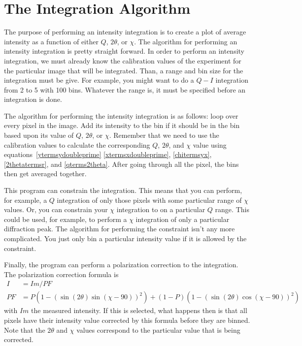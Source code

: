 \section{The Integration Algorithm}

The purpose of performing an intensity integration is 
to create a plot of average intensity as a function
of either $Q$, $2\theta$, or $\chi$. The algorithm
for performing an intensity integration is pretty
straight forward. In order to perform an intensity
integration, we must already know the calibration values
of the experiment for the particular image that will
be integrated. Than, a range and bin size for the
integration must be give. For example, you might
want to do a $Q-I$ integration from 2 to 5 with
100 bins. Whatever the range is, it 
must be specified before an integration is done.

The algorithm for performing the intensity integration
is as follows: loop over every pixel in the image. 
Add its intensity to the bin if it should be
in the bin based upon its value of $Q$, $2\theta$, or 
$\chi$. Remember that we need to use the calibration
values to calculate the corresponding $Q$, $2\theta$, and 
$\chi$ value using equations~\ref{ytermsydoubleprime}
\ref{xtermsxdoubleprime}, \ref{chitermsyx}, 
\ref{2thetatermsr}, and \ref{qterms2theta}.
After going through all the pixel, the bins then get averaged 
together. 

This program can constrain the integration. 
This means that you can perform, for example,
a $Q$ integration of only those pixels with some
particular range of $\chi$ values. Or, you can
constrain your $\chi$ integration to on a particular
$Q$ range. This could be used, for example, to
perform a $\chi$ integration of only a particular
diffraction peak. The algorithm for performing
the constraint isn't any more complicated. You just
only bin a particular intensity value if it is
allowed by the constraint.

Finally, the program can perform a polarization 
correction to the integration. The polarization 
correction formula is
\begin{align}
    I&=Im/PF \\ 
    PF&=P(1 - (\sin(2\theta)\sin(\chi-90))^2) + 
    (1 - P)(1 - (\sin(2\theta)\cos(\chi-90))^2)
\end{align}
with $Im$ the measured intensity. If this
is selected, what happens
then is that all pixels have their intensity
value corrected by this formula before they
are binned. Note that the $2\theta$ and $\chi$
values correspond to the particular value
that is being corrected.

